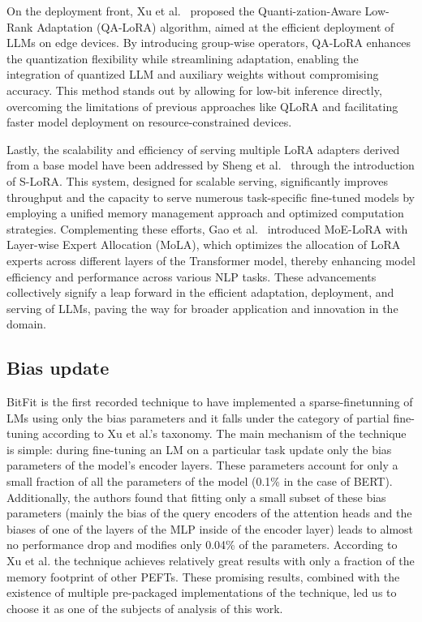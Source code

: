 \documentclass[fleqn,moreauthors,10pt]{ds_report}
\begin{document}
On the deployment front, Xu et al.~\cite{xu2023qalora} proposed the Quanti-zation-Aware Low-Rank Adaptation (QA-LoRA) algorithm, aimed at the efficient deployment of LLMs on edge devices. By introducing group-wise operators, QA-LoRA enhances the quantization flexibility while streamlining adaptation, enabling the integration of quantized LLM and auxiliary weights without compromising accuracy. This method stands out by allowing for low-bit inference directly, overcoming the limitations of previous approaches like QLoRA and facilitating faster model deployment on resource-constrained devices.

Lastly, the scalability and efficiency of serving multiple LoRA adapters derived from a base model have been addressed by Sheng et al.~\cite{sheng2023slora} through the introduction of S-LoRA. This system, designed for scalable serving, significantly improves throughput and the capacity to serve numerous task-specific fine-tuned models by employing a unified memory management approach and optimized computation strategies. Complementing these efforts, Gao et al.~\cite{gao2024higher} introduced MoE-LoRA with Layer-wise Expert Allocation (MoLA), which optimizes the allocation of LoRA experts across different layers of the Transformer model, thereby enhancing model efficiency and performance across various NLP tasks. These advancements collectively signify a leap forward in the efficient adaptation, deployment, and serving of LLMs, paving the way for broader application and innovation in the domain.

\subsection*{Bias update}

BitFit\cite{bitfit} is the first recorded technique to have implemented a sparse-finetunning of LMs using only the bias parameters and it falls under the category of partial fine-tuning according to Xu et al.'s taxonomy\cite{survey}. The main mechanism of the technique is simple: during fine-tuning an LM on a particular task update only the bias parameters of the model's encoder layers. These parameters account for only a small fraction of all the parameters of the model (0.1\% in the case of BERT). Additionally, the authors found that fitting only a small subset of these bias parameters (mainly the bias of the query encoders of the attention heads and the biases of one of the layers of the MLP inside of the encoder layer) leads to almost no performance drop and modifies only 0.04\% of the parameters. According to Xu et al. \cite{survey} the technique achieves relatively great results with only a fraction of the memory footprint of other PEFTs. These promising results, combined with the existence of multiple pre-packaged implementations of the technique, led us to choose it as one of the subjects of analysis of this work.  
\end{document}
